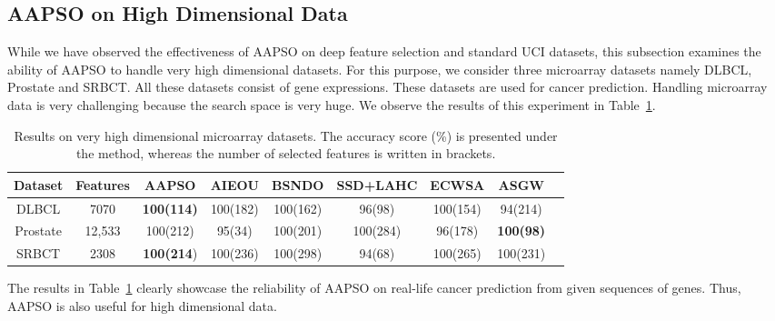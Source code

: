 \documentclass[final,3p,times]{elsarticle}
\begin{document}
\subsection{AAPSO on High Dimensional Data}
{While we have observed the effectiveness of AAPSO on deep feature selection and standard UCI {datasets,} this subsection examines the ability of AAPSO to handle very high dimensional datasets. For this purpose, {we consider} three microarray datasets namely DLBCL, Prostate and SRBCT. All these datasets consist of gene expressions. These datasets are used {for} cancer prediction. Handling microarray data is very challenging because the search space is very huge. We {observe} the results of this experiment in Table~\ref{tab:microarray}.}
\begin{table}[ht!]
    \centering
    \caption{{Results on very high dimensional microarray datasets. The accuracy score (\%) is presented under the method, whereas the number of selected features is written in brackets.}}
    \begin{tabular}{c|c|ccccccc}
    \toprule
    Dataset &Features& AAPSO	& AIEOU	& BSNDO	& SSD+LAHC	& ECWSA	& ASGW\\	
    \midrule
    DLBCL & 7070 & \textbf{100(114)} & 100(182) & 100(162) & 96(98) & 100(154) & 94(214)\\
    Prostate & 12,533 & 100(212) & 95(34) & 100(201) & 100(284) & 96(178) & \textbf{100(98)}\\
    SRBCT & 2308 & \textbf{100(214}) & 100(236) & 100(298) & 94(68) & 100(265) & 100(231)\\
    \bottomrule
    \end{tabular}
    
    \label{tab:microarray}
\end{table}
{The results in Table~\ref{tab:microarray} clearly {showcase} the reliability of AAPSO on real-life cancer prediction from given sequences of genes. Thus, AAPSO is also useful for high dimensional data.}
\end{document}
